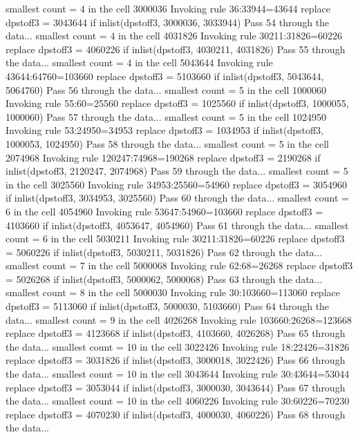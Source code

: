   smallest count = 4 in the cell      3000036
  Invoking rule 36:33944=43644
  replace dpstoff3 = 3043644 if inlist(dpstoff3, 3000036, 3033944)
Pass 54 through the data...
  smallest count = 4 in the cell      4031826
  Invoking rule 30211:31826=60226
  replace dpstoff3 = 4060226 if inlist(dpstoff3, 4030211, 4031826)
Pass 55 through the data...
  smallest count = 4 in the cell      5043644
  Invoking rule 43644:64760=103660
  replace dpstoff3 = 5103660 if inlist(dpstoff3, 5043644, 5064760)
Pass 56 through the data...
  smallest count = 5 in the cell      1000060
  Invoking rule 55:60=25560
  replace dpstoff3 = 1025560 if inlist(dpstoff3, 1000055, 1000060)
Pass 57 through the data...
  smallest count = 5 in the cell      1024950
  Invoking rule 53:24950=34953
  replace dpstoff3 = 1034953 if inlist(dpstoff3, 1000053, 1024950)
Pass 58 through the data...
  smallest count = 5 in the cell      2074968
  Invoking rule 120247:74968=190268
  replace dpstoff3 = 2190268 if inlist(dpstoff3, 2120247, 2074968)
Pass 59 through the data...
  smallest count = 5 in the cell      3025560
  Invoking rule 34953:25560=54960
  replace dpstoff3 = 3054960 if inlist(dpstoff3, 3034953, 3025560)
Pass 60 through the data...
  smallest count = 6 in the cell      4054960
  Invoking rule 53647:54960=103660
  replace dpstoff3 = 4103660 if inlist(dpstoff3, 4053647, 4054960)
Pass 61 through the data...
  smallest count = 6 in the cell      5030211
  Invoking rule 30211:31826=60226
  replace dpstoff3 = 5060226 if inlist(dpstoff3, 5030211, 5031826)
Pass 62 through the data...
  smallest count = 7 in the cell      5000068
  Invoking rule 62:68=26268
  replace dpstoff3 = 5026268 if inlist(dpstoff3, 5000062, 5000068)
Pass 63 through the data...
  smallest count = 8 in the cell      5000030
  Invoking rule 30:103660=113060
  replace dpstoff3 = 5113060 if inlist(dpstoff3, 5000030, 5103660)
Pass 64 through the data...
  smallest count = 9 in the cell      4026268
  Invoking rule 103660:26268=123668
  replace dpstoff3 = 4123668 if inlist(dpstoff3, 4103660, 4026268)
Pass 65 through the data...
  smallest count = 10 in the cell      3022426
  Invoking rule 18:22426=31826
  replace dpstoff3 = 3031826 if inlist(dpstoff3, 3000018, 3022426)
Pass 66 through the data...
  smallest count = 10 in the cell      3043644
  Invoking rule 30:43644=53044
  replace dpstoff3 = 3053044 if inlist(dpstoff3, 3000030, 3043644)
Pass 67 through the data...
  smallest count = 10 in the cell      4060226
  Invoking rule 30:60226=70230
  replace dpstoff3 = 4070230 if inlist(dpstoff3, 4000030, 4060226)
Pass 68 through the data...
